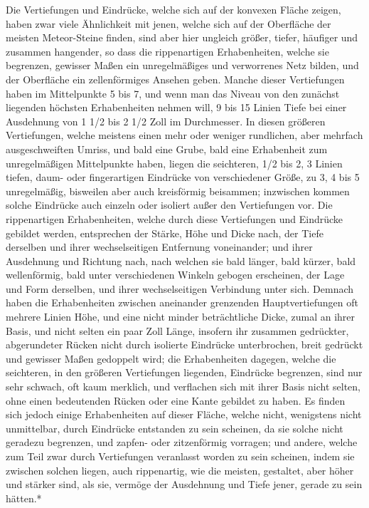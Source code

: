 \documentclass[a4paper, 11pt, oneside, german]{article}
\begin{document}
Die Vertiefungen und Eindrücke, welche sich auf der konvexen Fläche zeigen, haben zwar viele Ähnlichkeit mit jenen, welche sich auf der Oberfläche der meisten Meteor-Steine finden, sind aber hier ungleich größer, tiefer, häufiger und zusammen hangender, so dass die rippenartigen Erhabenheiten, welche sie begrenzen, gewisser Maßen ein unregelmäßiges und verworrenes Netz bilden, und der Oberfläche ein zellenförmiges Ansehen geben. Manche dieser Vertiefungen haben im Mittelpunkte 5 bis 7, und wenn man das Niveau von den zunächst liegenden höchsten Erhabenheiten nehmen will, 9 bis 15 Linien Tiefe bei einer Ausdehnung von 1 1/2 bis 2 1/2 Zoll im Durchmesser. In diesen größeren Vertiefungen, welche meistens einen mehr oder weniger rundlichen, aber mehrfach ausgeschweiften Umriss, und bald eine Grube, bald eine Erhabenheit zum unregelmäßigen Mittelpunkte haben, liegen die seichteren, 1/2 bis 2, 3 Linien tiefen, daum- oder fingerartigen Eindrücke von verschiedener Größe, zu 3, 4 bis 5 unregelmäßig, bisweilen aber auch kreisförmig beisammen; inzwischen kommen solche Eindrücke auch einzeln oder isoliert außer den Vertiefungen vor. Die rippenartigen Erhabenheiten, welche durch diese Vertiefungen und Eindrücke gebildet werden, entsprechen der Stärke, Höhe und Dicke nach, der Tiefe derselben und ihrer wechselseitigen Entfernung voneinander; und ihrer Ausdehnung und Richtung nach, nach welchen sie bald länger, bald kürzer, bald wellenförmig, bald unter verschiedenen Winkeln gebogen erscheinen, der Lage und Form derselben, und ihrer wechselseitigen Verbindung unter sich. Demnach haben die Erhabenheiten zwischen aneinander grenzenden Hauptvertiefungen oft mehrere Linien Höhe, und eine nicht minder beträchtliche Dicke, zumal an ihrer Basis, und nicht selten ein paar Zoll Länge, insofern ihr zusammen gedrückter, abgerundeter Rücken nicht durch isolierte Eindrücke unterbrochen, breit gedrückt und gewisser Maßen gedoppelt wird; die Erhabenheiten dagegen, welche die seichteren, in den größeren Vertiefungen liegenden, Eindrücke begrenzen, sind nur sehr schwach, oft kaum merklich, und verflachen sich mit ihrer Basis nicht selten, ohne einen bedeutenden Rücken oder eine Kante gebildet zu haben. Es finden sich jedoch einige Erhabenheiten auf dieser Fläche, welche nicht, wenigstens nicht unmittelbar, durch Eindrücke entstanden zu sein scheinen, da sie solche nicht geradezu begrenzen, und zapfen- oder zitzenförmig vorragen; und andere, welche zum Teil zwar durch Vertiefungen veranlasst worden zu sein scheinen, indem sie zwischen solchen liegen, auch rippenartig, wie die meisten, gestaltet, aber höher und stärker sind, als sie, vermöge der Ausdehnung und Tiefe jener, gerade zu sein hätten.*
\end{document}
